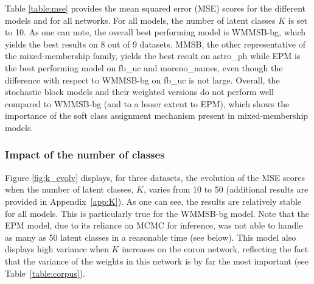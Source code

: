 Table \ref{table:mse} provides the mean squared error (MSE) scores for the different models and for all networks. For all models, the number of latent classes $K$ is set to 10.
As one can note, the overall best performing model is WMMSB-bg, which yields the best results on 8 out of 9 datasets. MMSB, the other representative of the mixed-membership family, yields the best result on astro\_ph while EPM is the best performing model on fb\_uc and moreno\_names, even though the difference with respect to WMMSB-bg on fb\_uc is not large. Overall, the stochastic block models and their weighted versions do not perform well compared to WMMSB-bg (and to a lesser extent to EPM), which shows the importance of the soft class assignment mechanism present in mixed-membership models. 


\subsubsection{Impact of the number of classes} 

Figure \ref{fig:k_evolv} displays, for three datasets, the evolution of the MSE scores when the number of latent classes, $K$, varies from 10 to 50  (additional results are provided in Appendix~\ref{app:K}). As one can see, the results are relatively stable for all models. This is particularly true for the WMMSB-bg model. Note that the EPM model, due to its reliance on MCMC for inference, was not able to handle as many as 50 latent classes in a reasonable time (see below). This model also displays high variance when $K$ increases on the enron network, reflecting the fact that the variance of the weights in this network is by far the most important (see Table~\ref{table:corpus}).

\begin{table*}[t]
\centering
	
\label{table:time}
\end{table*}

